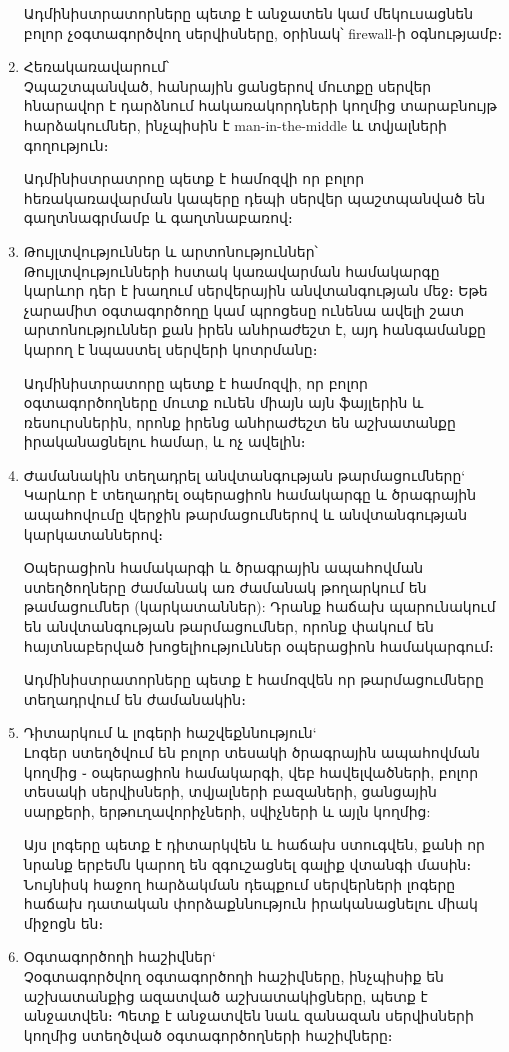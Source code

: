 \documentclass[12pt]{article}
\begin{document}
\begin{sloppypar}
\begin{enumerate}
    Ադմինիստրատորները պետք է անջատեն կամ մեկուսացնեն բոլոր չօգտագործվող
    սերվիսները, օրինակ՝ firewall-ի օգնությամբ։
\item Հեռակառավարում՝\\
    Չպաշտպանված, հանրային ցանցերով մուտքը սերվեր հնարավոր է դարձնում
    հակառակորդների կողմից տարաբնույթ հարձակումներ, ինչպիսին է
    man-in-the-middle և տվյալների գողություն։

    Ադմինիստրատրոը պետք է համոզվի որ բոլոր հեռակառավարման կապերը
    դեպի սերվեր պաշտպանված են գաղտնագրմամբ և գաղտնաբառով։
\item Թույլտվություններ և արտոնություններ՝\\
    Թույլտվությունների հստակ կառավարման համակարգը կարևոր դեր է խաղում
    սերվերային անվտանգության մեջ։ Եթե չարամիտ օգտագործողը կամ պրոցեսը
    ունենա ավելի շատ արտոնություններ քան իրեն անհրաժեշտ է, այդ հանգամանքը
    կարող է նպաստել սերվերի կոտրմանը։

    Ադմինիստրատորը պետք է համոզվի, որ բոլոր օգտագործողները մուտք ունեն
    միայն այն ֆայլերին և ռեսուրսներին, որոնք իրենց անհրաժեշտ են
    աշխատանքը իրականացնելու համար, և ոչ ավելին։
\item Ժամանակին տեղադրել անվտանգության թարմացումները`\\
    Կարևոր է տեղադրել օպերացիոն համակարգը և ծրագրային ապահովումը
    վերջին թարմացումներով և անվտանգության կարկատաններով։

	Օպերացիոն համակարգի և ծրագրային ապահովման ստեղծողները ժամանակ
	առ ժամանակ թողարկում են թամացումներ (կարկատաններ):
	Դրանք հաճախ պարունակում են անվտանգության թարմացումներ, որոնք
	փակում են հայտնաբերված խոցելիություններ օպերացիոն համակարգում։

    Ադմինիստրատորները պետք է համոզվեն որ թարմացումները տեղադրվում են
    ժամանակին։
\item Դիտարկում և լոգերի հաշվեքննություն`\\
    Լոգեր ստեղծվում են բոլոր տեսակի ծրագրային ապահովման կողմից ֊
    օպերացիոն համակարգի, վեբ հավելվածների, բոլոր տեսակի սերվիսների,
    տվյալների բազաների, ցանցային սարքերի, երթուղավորիչների, սվիչների
	և այլն կողմից:

    Այս լոգերը պետք է դիտարկվեն և հաճախ ստուգվեն, քանի որ նրանք երբեմն
    կարող են զգուշացնել գալիք վտանգի մասին։ Նույնիսկ հաջող հարձակման
    դեպքում սերվերների լոգերը հաճախ դատական փորձաքննություն
    իրականացնելու միակ միջոցն են։
\item Օգտագործողի հաշիվներ`\\
    Չօգտագործվող օգտագործողի հաշիվները, ինչպիսիք են աշխատանքից ազատված
    աշխատակիցները, պետք է անջատվեն։ Պետք է անջատվեն նաև զանազան
    սերվիսների կողմից ստեղծված օգտագործողների հաշիվները։


\end{enumerate}
\end{sloppypar}
\end{document}
